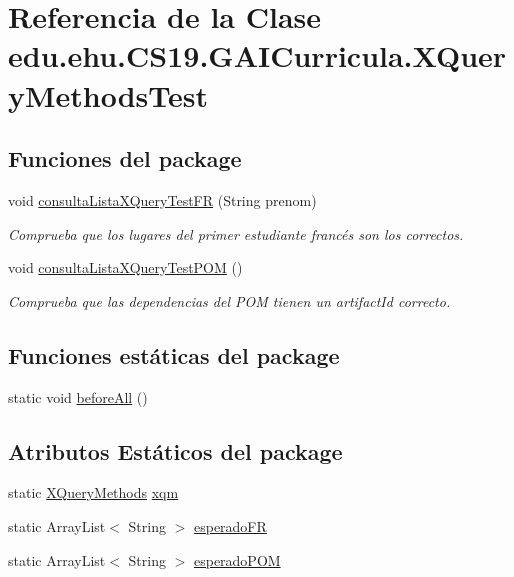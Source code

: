 \hypertarget{a00036}{}\section{Referencia de la Clase edu.\+ehu.\+C\+S19.\+G\+A\+I\+Curricula.\+X\+Query\+Methods\+Test}
\label{a00036}
\subsection*{Funciones del \textquotesingle{}package\textquotesingle{}}
\begin{DoxyCompactItemize}
\item 
void \mbox{\hyperlink{a00036_a04f2d4aeaea59773f16eeb6e8d35ab0b}{consulta\+Lista\+X\+Query\+Test\+FR}} (String prenom)
\begin{DoxyCompactList}\small\item\em Comprueba que los lugares del primer estudiante francés son los correctos. \end{DoxyCompactList}\item 
void \mbox{\hyperlink{a00036_a424440e0527b515a698294d6859d258a}{consulta\+Lista\+X\+Query\+Test\+P\+OM}} ()
\begin{DoxyCompactList}\small\item\em Comprueba que las dependencias del P\+OM tienen un artifact\+Id correcto. \end{DoxyCompactList}\end{DoxyCompactItemize}
\subsection*{Funciones estáticas del \textquotesingle{}package\textquotesingle{}}
\begin{DoxyCompactItemize}
\item 
static void \mbox{\hyperlink{a00036_a2c438eb4a86c03b10b10d19f8b387132}{before\+All}} ()
\end{DoxyCompactItemize}
\subsection*{Atributos Estáticos del \textquotesingle{}package\textquotesingle{}}
\begin{DoxyCompactItemize}
\item 
static \mbox{\hyperlink{a00032}{X\+Query\+Methods}} \mbox{\hyperlink{a00036_a39a41e2d9871da80d3ac11ea85702ed3}{xqm}}
\item 
static Array\+List$<$ String $>$ \mbox{\hyperlink{a00036_aee6b73a3384d4b23a34648334a099b97}{esperado\+FR}}
\item 
static Array\+List$<$ String $>$ \mbox{\hyperlink{a00036_ab6d2fa743081f2227d9a4e00d9718458}{esperado\+P\+OM}}
\end{DoxyCompactItemize}


